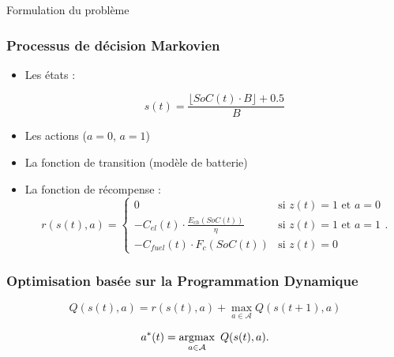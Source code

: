 \documentclass[french]{beamer}
\begin{document}
{\begin{frame}{Formulation du problème}
\end{frame}


\begin{frame}
\frametitle{Processus de décision Markovien}
\begin{center}
\begin{itemize}
\item Les états :
 
\begin{equation}
s(t) = \frac{\lfloor \mathit{SoC}(t) \cdot B \rfloor + 0.5}{B} 
\label{eq:state}
\end{equation}
\item Les actions ($a=0$, $a=1$)
\item La fonction de transition (modèle de batterie)
\item La fonction de récompense :
\begin{equation}
r(s(t),a) =
\begin{cases}
0 & \text{si $z(t)=1$ et $a=0$}\\
-C_{el}(t) \cdot \frac{E_{ch}(SoC(t))}{\eta} & \text{si $z(t)=1$ et $a=1$}\\
- C_{fuel}(t) \cdot F_{c}(SoC(t)) & \text{si $z(t)=0$}   
\end{cases}.\label{eq:reward}
\end{equation}
\end{itemize}
\end{center}
\end{frame}



\begin{frame}
\begin{center}
\frametitle{Optimisation basée sur la Programmation Dynamique}

\begin{equation}
Q(s(t),a) =
r(s(t),a) + \max\limits_{a\in\mathcal{A}} Q(s(t+1),a) 
\end{equation}

\begin{equation}
a^*(t) = \argmax\limits_{a\in\mathcal{A}}~Q(s(t),a).\label{eq:adecisions}
\end{equation}
\end{center}
\end{frame}


}
\end{document}
